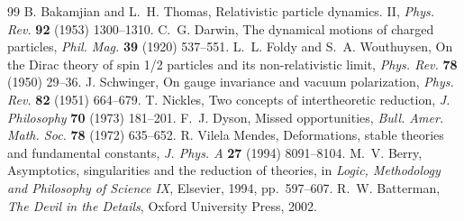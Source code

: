 \documentclass[11pt,a4paper]{article}
\theoremstyle{plain}
\theoremstyle{definition}
\theoremstyle{remark}
\begin{document}
\begin{thebibliography}{99}
 B. Bakamjian and L.~H. Thomas, Relativistic particle dynamics. II, \emph{Phys. Rev.} \textbf{92} (1953) 1300--1310.
 C.~G. Darwin, The dynamical motions of charged particles, \emph{Phil. Mag.} \textbf{39} (1920) 537--551.
 L.~L. Foldy and S.~A. Wouthuysen, On the Dirac theory of spin 1/2 particles and its non-relativistic limit, \emph{Phys. Rev.} \textbf{78} (1950) 29--36.
 J. Schwinger, On gauge invariance and vacuum polarization, \emph{Phys. Rev.} \textbf{82} (1951) 664--679.
 T. Nickles, Two concepts of intertheoretic reduction, \emph{J. Philosophy} \textbf{70} (1973) 181--201.
 F.~J. Dyson, Missed opportunities, \emph{Bull. Amer. Math. Soc.} \textbf{78} (1972) 635--652.
 R. Vilela Mendes, Deformations, stable theories and fundamental constants, \emph{J. Phys. A} \textbf{27} (1994) 8091--8104.
 M.~V. Berry, Asymptotics, singularities and the reduction of theories, in \emph{Logic, Methodology and Philosophy of Science IX}, Elsevier, 1994, pp.~597--607.
 R.~W. Batterman, \emph{The Devil in the Details}, Oxford University Press, 2002.
\end{thebibliography}
\end{document}
